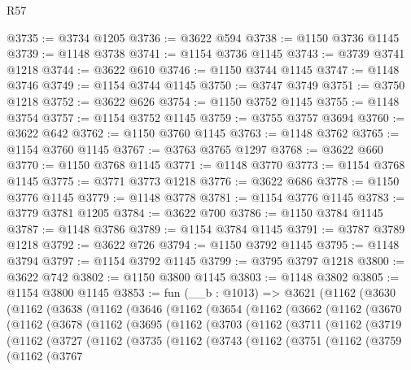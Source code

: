 \begin{lexlean}{R57}
\begin{coremodule}
@3735 := @3734 @1205
@3736 := @3622 @594
@3738 := @1150 @3736 @1145
@3739 := @1148 @3738
@3741 := @1154 @3736 @1145
@3743 := @3739 @3741 @1218
@3744 := @3622 @610
@3746 := @1150 @3744 @1145
@3747 := @1148 @3746
@3749 := @1154 @3744 @1145
@3750 := @3747 @3749
@3751 := @3750 @1218
@3752 := @3622 @626
@3754 := @1150 @3752 @1145
@3755 := @1148 @3754
@3757 := @1154 @3752 @1145
@3759 := @3755 @3757 @3694
@3760 := @3622 @642
@3762 := @1150 @3760 @1145
@3763 := @1148 @3762
@3765 := @1154 @3760 @1145
@3767 := @3763 @3765 @1297
@3768 := @3622 @660
@3770 := @1150 @3768 @1145
@3771 := @1148 @3770
@3773 := @1154 @3768 @1145
@3775 := @3771 @3773 @1218
@3776 := @3622 @686
@3778 := @1150 @3776 @1145
@3779 := @1148 @3778
@3781 := @1154 @3776 @1145
@3783 := @3779 @3781 @1205
@3784 := @3622 @700
@3786 := @1150 @3784 @1145
@3787 := @1148 @3786
@3789 := @1154 @3784 @1145
@3791 := @3787 @3789 @1218
@3792 := @3622 @726
@3794 := @1150 @3792 @1145
@3795 := @1148 @3794
@3797 := @1154 @3792 @1145
@3799 := @3795 @3797 @1218
@3800 := @3622 @742
@3802 := @1150 @3800 @1145
@3803 := @1148 @3802
@3805 := @1154 @3800 @1145
@3853 := fun (__b : @1013) =>
  @3621
    (@1162
      (@3630
        (@1162
          (@3638
            (@1162
              (@3646
                (@1162
                  (@3654
                    (@1162
                      (@3662
                        (@1162
                          (@3670
                            (@1162
                              (@3678
                                (@1162
                                  (@3695
                                    (@1162
                                      (@3703
                                        (@1162
                                          (@3711
                                            (@1162
                                              (@3719
                                                (@1162
                                                  (@3727
                                                    (@1162
                                                      (@3735
                                                        (@1162
                                                          (@3743
                                                            (@1162
                                                              (@3751
                                                                (@1162
                                                                  (@3759
                                                                    (@1162
                                                                      (@3767

\end{coremodule}
\end{lexlean}
